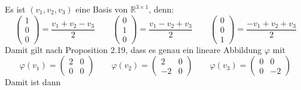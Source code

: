 \documentclass[a4paper,graphics,11pt]{article}
\begin{document}
Es ist $(v_1, v_2, v_3)$ eine Basis von $\mathbb{R}^{3\times 1}$, denn:
$$
    \begin{pmatrix}1\\0\\0\end{pmatrix} = \frac{v_1 + v_2 - v_3}{2}
    \qquad
    \begin{pmatrix}0\\1\\0\end{pmatrix} = \frac{v_1 - v_2 + v_3}{2}
    \qquad
    \begin{pmatrix}0\\0\\1\end{pmatrix} = \frac{-v_1 + v_2 + v_3}{2}
$$
Damit gilt nach Proposition 2.19, dass es genau ein lineare Abbildung $\varphi$ mit
$$
    \varphi(v_1) =
\begin{pmatrix}
    2 & 0\\
    0 & 0
\end{pmatrix}
\qquad
\varphi(v_2) =
\begin{pmatrix}
    2 & 0\\
    -2 & 0
\end{pmatrix}
\qquad
\varphi(v_3) =
\begin{pmatrix}
    0 & 0\\
    0 & -2
\end{pmatrix}
$$
Damit ist dann
\end{document}
